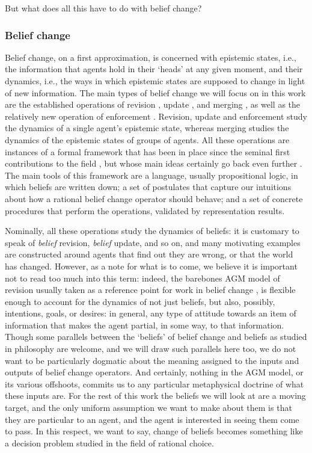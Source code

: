 But what does all this have to do with belief change?

\subsubsection{Belief change}
Belief change, on a first approximation, is concerned with epistemic states, 
i.e., the information that agents hold in their `heads' at any given moment,
and their dynamics, i.e., the ways in which epistemic states are supposed to change
in light of new information.
The main types of belief change we will focus on in this work are the established operations of
revision \cite{KatsunoM92}, 
update \cite{KatsunoM91},
and merging \cite{KoniecznyP02,KoniecznyP11},
as well as the relatively new operation of 
enforcement \cite{HaretWW18}.
Revision, update and enforcement study the dynamics of 
a single agent's epistemic state,
whereas merging studies the dynamics of the epistemic states 
of groups of agents.
All these operations are instances of a formal framework that
has been in place since the seminal first contributions to the field
\cite{AlchourronGM85,AlchourronM85,GardenforsM88,Gardenfors88},
but whose main ideas certainly go back even further 
\cite{Harper76,Levi80}.
The main tools of this framework are a language, usually propositional logic,
in which beliefs are written down;
a set of postulates that capture our intuitions about 
how a rational belief change operator should behave;
and a set of concrete procedures that perform the operations,
validated by representation results.

Nominally, all these operations study the dynamics of beliefs:
it is customary to speak of \emph{belief} revision, 
\emph{belief} update, and so on,
and many motivating examples are constructed 
around agents that find out they are wrong, or that 
the world has changed. 
However, as a note for what is to come,
we believe it is important not to read too much into this term:
indeed, the barebones AGM model of revision 
usually taken as a reference point for work in belief change \cite{AlchourronGM85},
is flexible enough to account for the dynamics of not just beliefs,
but also, possibly, intentions, goals, or desires:
in general, any type of attitude towards an item of information 
that makes the agent partial, in some way, to that information.
Though some parallels between the `beliefs' of belief change
and beliefs as studied in philosophy \cite{Schwitzgebel19}
are welcome, and we will draw such parallels here too,
we do not want to be particularly dogmatic about the meaning 
assigned to the inputs and outputs of belief change operators.
And certainly, nothing in the AGM model, or its various offshoots, 
commits us to any particular metaphysical doctrine of what 
these inputs are.
For the rest of this work the beliefs we will look at 
are a moving target, and the only uniform assumption we want to make about 
them is that they are particular to an agent,
and the agent is interested in seeing them come to pass.
In this respect, we want to say,
change of beliefs becomes something like a decision problem
studied in the field of rational choice.

